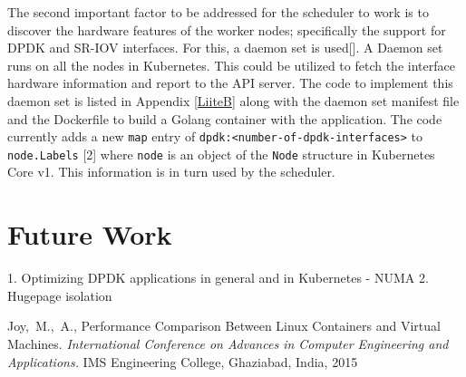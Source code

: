 \documentclass[english, 12pt, a4paper, elec, utf8, a-1b, online]{aaltothesis}
\begin{document}
The second important factor to be addressed for the scheduler to work is to discover the hardware features of the worker nodes; specifically the support for DPDK and SR-IOV interfaces. For this, a daemon set is used[]. A Daemon set runs on all the nodes in Kubernetes. This could be utilized to fetch the interface hardware information and report to the API server. The code to implement this daemon set is listed in Appendix \ref{LiiteB} along with the daemon set manifest file and the Dockerfile to build a Golang container with the application. The code currently adds a new \lstinline{map} entry of \lstinline{dpdk:<number-of-dpdk-interfaces>} to \lstinline{node.Labels} [2] where \lstinline{node} is an object of the \lstinline{Node} structure in Kubernetes Core v1. This information is in turn used by the scheduler.

\clearpage
\section{Future Work}
1. Optimizing DPDK applications in general and in Kubernetes - NUMA
2. Hugepage isolation
\clearpage
\thesisbibliography
\begin{thebibliography}{99}

 Joy,\ M.,\ A., Performance Comparison Between Linux Containers and Virtual Machines. \textit{International Conference on Advances in Computer Engineering and Applications.} IMS Engineering College, Ghaziabad, India, 2015
\end{thebibliography}

\clearpage
\thesisappendix
\end{document}

